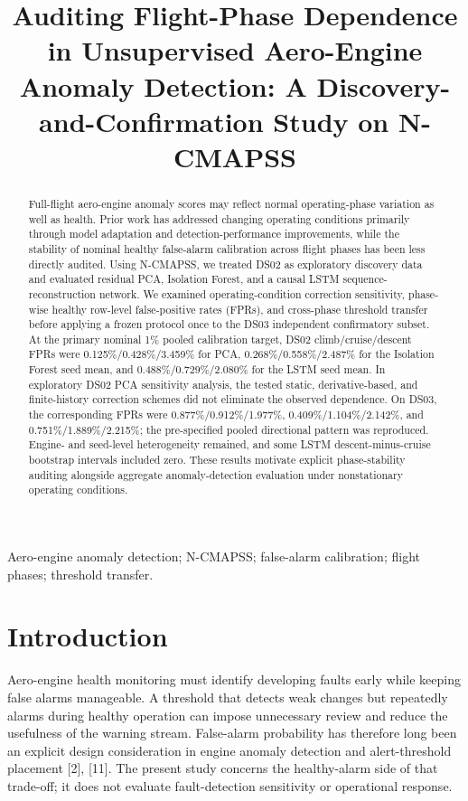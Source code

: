 \documentclass[10pt,conference]{IEEEtran}
\title{Auditing Flight-Phase Dependence in Unsupervised Aero-Engine Anomaly Detection: A Discovery-and-Confirmation Study on N-CMAPSS}
\author{\IEEEauthorblockN{Jinghang Mei}\IEEEauthorblockA{School of Electrical and Computer Engineering\\The University of Sydney\\Sydney, Australia\\Email: [to be added]}}
\begin{document}
\maketitle
\begin{abstract}
Full-flight aero-engine anomaly scores may reflect normal operating-phase variation as well as health. Prior work has addressed changing operating conditions primarily through model adaptation and detection-performance improvements, while the stability of nominal healthy false-alarm calibration across flight phases has been less directly audited. Using N-CMAPSS, we treated DS02 as exploratory discovery data and evaluated residual PCA, Isolation Forest, and a causal LSTM sequence-reconstruction network. We examined operating-condition correction sensitivity, phase-wise healthy row-level false-positive rates (FPRs), and cross-phase threshold transfer before applying a frozen protocol once to the DS03 independent confirmatory subset. At the primary nominal 1\% pooled calibration target, DS02 climb/cruise/descent FPRs were 0.125\%/0.428\%/3.459\% for PCA, 0.268\%/0.558\%/2.487\% for the Isolation Forest seed mean, and 0.488\%/0.729\%/2.080\% for the LSTM seed mean. In exploratory DS02 PCA sensitivity analysis, the tested static, derivative-based, and finite-history correction schemes did not eliminate the observed dependence. On DS03, the corresponding FPRs were 0.877\%/0.912\%/1.977\%, 0.409\%/1.104\%/2.142\%, and 0.751\%/1.889\%/2.215\%; the pre-specified pooled directional pattern was reproduced. Engine- and seed-level heterogeneity remained, and some LSTM descent-minus-cruise bootstrap intervals included zero. These results motivate explicit phase-stability auditing alongside aggregate anomaly-detection evaluation under nonstationary operating conditions.
\end{abstract}
\begin{IEEEkeywords}
Aero-engine anomaly detection; N-CMAPSS; false-alarm calibration; flight phases; threshold transfer.
\end{IEEEkeywords}

\section{Introduction}\label{introduction}

Aero-engine health monitoring must identify developing faults early while keeping false alarms manageable. A threshold that detects weak changes but repeatedly alarms during healthy operation can impose unnecessary review and reduce the usefulness of the warning stream. False-alarm probability has therefore long been an explicit design consideration in engine anomaly detection and alert-threshold placement {[}2{]}, {[}11{]}. The present study concerns the healthy-alarm side of that trade-off; it does not evaluate fault-detection sensitivity or operational response.
\end{document}
